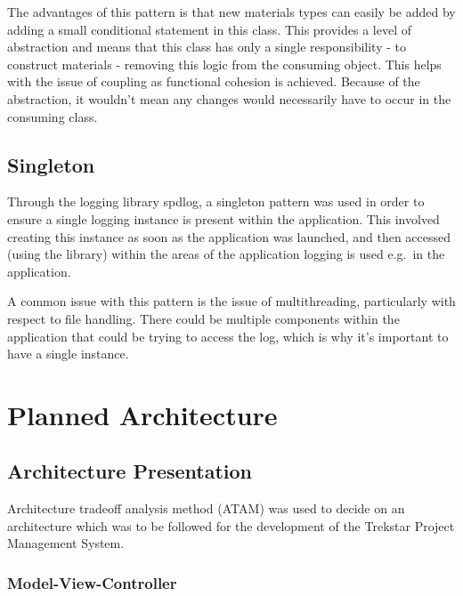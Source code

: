 \documentclass[
  english,
  a4paper,
,tablecaptionabove
]{scrartcl}
\begin{document}
The advantages of this pattern is that new materials types can easily be
added by adding a small conditional statement in this class. This
provides a level of abstraction and means that this class has only a
single responsibility - to construct materials - removing this logic
from the consuming object. This helps with the issue of coupling as
functional cohesion is achieved. Because of the abstraction, it wouldn't
mean any changes would necessarily have to occur in the consuming class.

\hypertarget{singleton}{%
\subsection{Singleton}\label{singleton}}

Through the logging library spdlog, a singleton pattern was used in
order to ensure a single logging instance is present within the
application. This involved creating this instance as soon as the
application was launched, and then accessed (using the library) within
the areas of the application logging is used e.g.~in the application.

A common issue with this pattern is the issue of multithreading,
particularly with respect to file handling. There could be multiple
components within the application that could be trying to access the
log, which is why it's important to have a single instance.

\newpage

\hypertarget{planned-architecture}{%
\section{Planned Architecture}\label{planned-architecture}}

\hypertarget{architecture-presentation}{%
\subsection{Architecture Presentation}\label{architecture-presentation}}

Architecture tradeoff analysis method (ATAM) was used to decide on an
architecture which was to be followed for the development of the
Trekstar Project Management System.

\hypertarget{model-view-controller}{%
\subsubsection{Model-View-Controller}\label{model-view-controller}}
\end{document}
